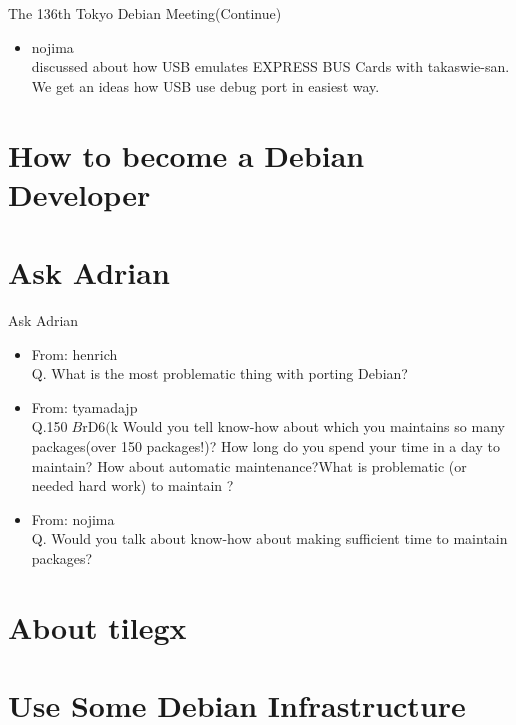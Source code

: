 \begin{frame}{The 136th Tokyo Debian Meeting(Continue)}

\begin{itemize}
\item nojima\\
  discussed about how USB emulates EXPRESS BUS Cards with takaswie-san. We get an ideas how USB use debug port in easiest way.
\end{itemize}

\end{frame}

\section{How to become a Debian Developer}

\section{Ask Adrian}
\begin{frame}{Ask Adrian}

\begin{itemize}
\item From: henrich\\
  Q. What is the most problematic thing with porting Debian?
\item From: tyamadajp\\
  Q.150$B$rD6$($k%
  Would you tell know-how about which you maintains so many packages(over 150 packages!)? How long do you spend your time in a day to maintain? How about automatic maintenance?What is  problematic (or needed hard work) to maintain ?
\item From: nojima\\
 Q. Would you talk about know-how about making sufficient time to maintain packages?
\end{itemize}

\end{frame}


\section{About tilegx}

\section{Use Some Debian Infrastructure}

